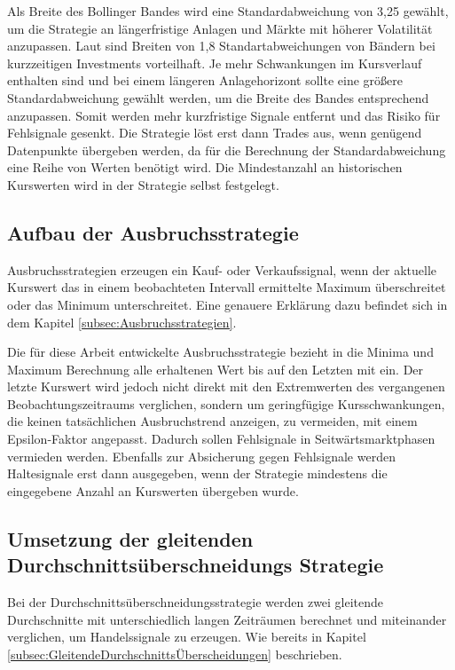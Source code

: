 Als Breite des Bollinger Bandes wird eine Standardabweichung von 3,25 gewählt, um die Strategie an längerfristige Anlagen und Märkte mit höherer Volatilität anzupassen.
Laut \cite{kabasinskas2010bollinger} sind Breiten von 1,8 Standartabweichungen von Bändern bei kurzzeitigen Investments vorteilhaft.
Je mehr Schwankungen im Kursverlauf enthalten sind und bei einem längeren Anlagehorizont sollte eine größere Standardabweichung gewählt werden, um die Breite des Bandes entsprechend anzupassen.
Somit werden mehr kurzfristige Signale entfernt und das Risiko für Fehlsignale gesenkt.
Die Strategie löst erst dann Trades aus, wenn genügend Datenpunkte übergeben werden, da für die Berechnung der Standardabweichung eine Reihe von Werten benötigt wird.
Die Mindestanzahl an historischen Kurswerten wird in der Strategie selbst festgelegt.

\subsection{Aufbau der Ausbruchsstrategie}
\label{subsec:AufbauderAusbruchsstrategie}

Ausbruchsstrategien erzeugen ein Kauf- oder Verkaufssignal, wenn der aktuelle Kurswert das in einem beobachteten Intervall ermittelte Maximum überschreitet oder das Minimum unterschreitet.
Eine genauere Erklärung dazu befindet sich in dem Kapitel \ref{subsec:Ausbruchsstrategien}.

Die für diese Arbeit entwickelte Ausbruchsstrategie bezieht in die Minima und Maximum Berechnung alle erhaltenen Wert bis auf den Letzten mit ein.
Der letzte Kurswert wird jedoch nicht direkt mit den Extremwerten des vergangenen Beobachtungszeitraums verglichen, sondern
um geringfügige Kursschwankungen, die keinen tatsächlichen Ausbruchstrend anzeigen, zu vermeiden, mit einem Epsilon-Faktor angepasst.
Dadurch sollen Fehlsignale in Seitwärtsmarktphasen vermieden werden.
Ebenfalls zur Absicherung gegen Fehlsignale werden Haltesignale erst dann ausgegeben, wenn der Strategie mindestens die eingegebene Anzahl an Kurswerten übergeben wurde.

\subsection{Umsetzung der gleitenden Durchschnittsüberschneidungs Strategie}
\label{subsec:UmsetzungdergleitendenDurchschnittsüberschneidungsStrategie}

Bei der Durchschnittsüberschneidungsstrategie werden zwei gleitende Durchschnitte mit unterschiedlich langen Zeiträumen berechnet und miteinander verglichen, um Handelssignale zu erzeugen.
Wie bereits in Kapitel \ref{subsec:GleitendeDurchschnittsÜberscheidungen} beschrieben.

